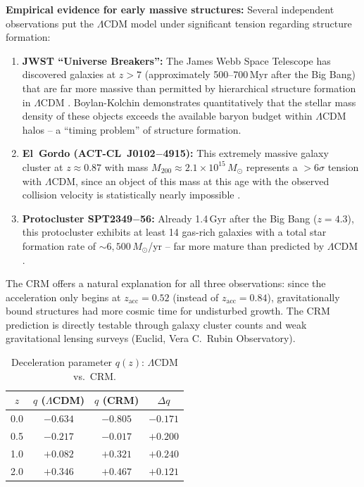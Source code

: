 \documentclass[aps,prd,twocolumn,superscriptaddress,nofootinbib]{revtex4-2}
\begin{document}
\textbf{Empirical evidence for early massive structures:} Several independent observations put the $\Lambda$CDM model under significant tension regarding structure formation:
\begin{enumerate}
\item \textbf{JWST ``Universe Breakers'':} The James Webb Space Telescope has discovered galaxies at $z > 7$ (approximately 500--700\,Myr after the Big Bang) that are far more massive than permitted by hierarchical structure formation in $\Lambda$CDM \cite{Labbe2023}. Boylan-Kolchin \cite{BoylanKolchin2023} demonstrates quantitatively that the stellar mass density of these objects exceeds the available baryon budget within $\Lambda$CDM halos -- a ``timing problem'' of structure formation.
\item \textbf{El~Gordo (ACT-CL~J0102$-$4915):} This extremely massive galaxy cluster at $z \approx 0.87$ with mass $M_{200} \approx 2.1 \times 10^{15}\,M_\odot$ represents a $> 6\sigma$ tension with $\Lambda$CDM, since an object of this mass at this age with the observed collision velocity is statistically nearly impossible \cite{Asencio2023}.
\item \textbf{Protocluster SPT2349$-$56:} Already 1.4\,Gyr after the Big Bang ($z = 4.3$), this protocluster exhibits at least 14 gas-rich galaxies with a total star formation rate of $\sim\!6{,}500\,M_\odot$/yr -- far more mature than predicted by $\Lambda$CDM \cite{Miller2018}.
\end{enumerate}

The CRM offers a natural explanation for all three observations: since the acceleration only begins at $z_{\mathrm{acc}} = 0.52$ (instead of $z_{\mathrm{acc}} = 0.84$), gravitationally bound structures had more cosmic time for undisturbed growth. The CRM prediction is directly testable through galaxy cluster counts and weak gravitational lensing surveys (Euclid, Vera C.\ Rubin Observatory).

\begin{table}[htbp]
\centering
\caption{Deceleration parameter $q(z)$: $\Lambda$CDM vs.\ CRM.}
\label{tab:qz}
\begin{tabular}{cccc}
\toprule
$z$ & $q$ ($\Lambda$CDM) & $q$ (CRM) & $\Delta q$ \\
\midrule
0.0 & $-0.634$ & $-0.805$ & $-0.171$ \\
0.5 & $-0.217$ & $-0.017$ & $+0.200$ \\
1.0 & $+0.082$ & $+0.321$ & $+0.240$ \\
2.0 & $+0.346$ & $+0.467$ & $+0.121$ \\
\bottomrule
\end{tabular}
\end{table}
\end{document}
